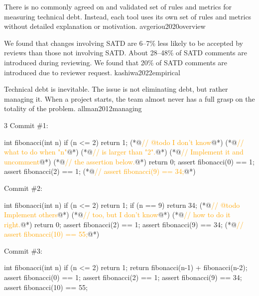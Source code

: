 \documentclass{article}
\begin{document}
  {There is no commonly agreed on and validated set of rules and metrics for measuring technical debt. Instead, each tool uses its own set of rules and metrics without detailed explanation or motivation.}
  {avgeriou2020overview}

  {We found that changes involving SATD are 6–7\% less likely to be accepted by reviews than those not involving SATD. About 28–48\% of SATD comments are introduced during reviewing. We found that 20\% of SATD comments are introduced due to reviewer request.}
  {kashiwa2022empirical}


  {Technical debt is inevitable. The issue is not eliminating debt, but rather managing it. When a project starts, the team almost never has a full grasp on the totality of the problem.}
  {allman2012managing}

\begin{pptWide}{3}
Commit \#1:\par
{\scriptsize\begin{ffcode}
int fibonacci(int n) {
  if (n <= 2) {
    return 1;
  }
  (*@\textcolor{orange}{// @todo I don't know}@*)
  (*@\textcolor{orange}{// what to do when "n"}@*)
  (*@\textcolor{orange}{// is larger than "2".}@*)
  (*@\textcolor{orange}{// Implement it and uncomment}@*)
  (*@\textcolor{orange}{// the assertion below.}@*)
  return 0;
}
assert fibonacci(0) == 1;
assert fibonacci(2) == 1;
(*@\textcolor{orange}{// assert fibonacci(9) == 34;}@*)
\end{ffcode}
}
\par\columnbreak\par
Commit \#2:\par
{\scriptsize\begin{ffcode}
int fibonacci(int n) {
  if (n <= 2) {
    return 1;
  }
  if (n == 9) {
    return 34;
  }
  (*@\textcolor{orange}{// @todo Implement others}@*)
  (*@\textcolor{orange}{// too, but I don't know}@*)
  (*@\textcolor{orange}{// how to do it right.}@*)
  return 0;
}
assert fibonacci(2) == 1;
assert fibonacci(9) == 34;
(*@\textcolor{orange}{// assert fibonacci(10) == 55;}@*)
\end{ffcode}
}
\par\columnbreak\par
Commit \#3:\par
{\scriptsize\begin{ffcode}
int fibonacci(int n) {
  if (n <= 2) {
    return 1;
  }
  return fibonacci(n-1)
    + fibonacci(n-2);
}
assert fibonacci(0) == 1;
assert fibonacci(2) == 1;
assert fibonacci(9) == 34;
assert fibonacci(10) == 55;
\end{ffcode}
}
\end{pptWide}
\plush{}
\end{document}
